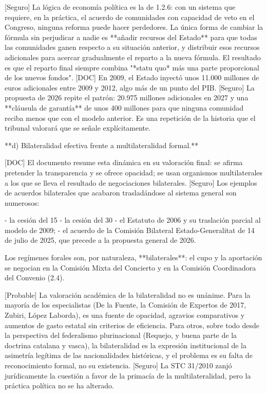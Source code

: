 \documentclass[10pt,a4paper]{article}
\begin{document}
[Seguro] La lógica de economía política es la de 1.2.6: con un sistema que requiere, en la práctica, el acuerdo de comunidades con capacidad de veto en el Congreso, ninguna reforma puede hacer perdedores. La única forma de cambiar la fórmula sin perjudicar a nadie es **añadir recursos del Estado** para que todas las comunidades ganen respecto a su situación anterior, y distribuir esos recursos adicionales para acercar gradualmente el reparto a la nueva fórmula. El resultado es que el reparto final siempre combina "*statu quo* más una parte proporcional de los nuevos fondos". [DOC] En 2009, el Estado inyectó unos 11.000 millones de euros adicionales entre 2009 y 2012, algo más de un punto del PIB. [Seguro] La propuesta de 2026 repite el patrón: 20.975 millones adicionales en 2027 y una **cláusula de garantía** de unos 400 millones para que ninguna comunidad reciba menos que con el modelo anterior. Es una repetición de la historia que el tribunal valorará que se señale explícitamente.

**d) Bilateralidad efectiva frente a multilateralidad formal.**

[DOC] El documento resume esta dinámica en su valoración final: se afirma pretender la transparencia y se ofrece opacidad; se usan organismos multilaterales a los que se lleva el resultado de negociaciones bilaterales. [Seguro] Los ejemplos de acuerdos bilaterales que acabaron trasladándose al sistema general son numerosos:

- la cesión del 15%
- la cesión del 30%
- el Estatuto de 2006 y su traslación parcial al modelo de 2009;
- el acuerdo de la Comisión Bilateral Estado-Generalitat de 14 de julio de 2025, que precede a la propuesta general de 2026.

Los regímenes forales son, por naturaleza, **bilaterales**: el cupo y la aportación se negocian en la Comisión Mixta del Concierto y en la Comisión Coordinadora del Convenio (2.4).

[Probable] La valoración académica de la bilateralidad no es unánime. Para la mayoría de los especialistas (De la Fuente, la Comisión de Expertos de 2017, Zubiri, López Laborda), es una fuente de opacidad, agravios comparativos y aumentos de gasto estatal sin criterios de eficiencia. Para otros, sobre todo desde la perspectiva del federalismo plurinacional (Requejo, y buena parte de la doctrina catalana y vasca), la bilateralidad es la expresión institucional de la asimetría legítima de las nacionalidades históricas, y el problema es su falta de reconocimiento formal, no su existencia. [Seguro] La STC 31/2010 zanjó jurídicamente la cuestión a favor de la primacía de la multilateralidad, pero la práctica política no se ha alterado.
\end{document}
